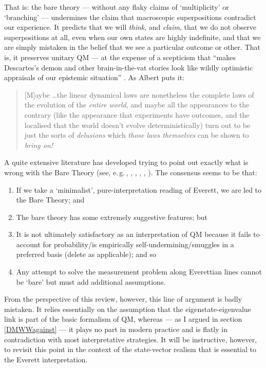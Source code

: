 \documentclass[12pt]{article}
\newcommand{\egc}{\mbox{e.\,g.\,}}
\begin{document}
That is: the bare theory --- without any flaky claims of `multiplicity' or `branching' --- undermines the claim that macroscopic superpositions contradict our experience. It predicts that we will \emph{think}, and \emph{claim}, that we do not observe superpositions at all, even when our own states are highly indefinite, and that we are simply mistaken in the belief that we see a particular outcome or other. That is, it preserves unitary QM --- at the expense of a scepticism that ``makes Descartes's demon and other brain-in-the-vat stories look like wildly optimistic appraisals of our epistemic situation'' \cite[p.\,94]{barrettbook}. As Albert puts it:
\begin{quote}
[M]aybe \ldots the linear dynamical laws are nonetheless the complete laws of the evolution of the \emph{entire world}, and maybe all the appearances to the contrary (like the appearance that experiments have outcomes, and the localised that the world doesn't evolve deterministically) turn out to be just the sorts of \emph{delusions} which \emph{those laws themselves} can be shown to \emph{bring on!} 
\end{quote}
A quite extensive literature has developed trying to point out exactly what is wrong with the Bare Theory (see, \egc, , , , , ). The consensus seems to be that:
\begin{enumerate}
\item If we take a `minimalist', pure-interpretation reading of Everett, we are led to the Bare Theory; and
\item The bare theory has some extremely suggestive features; but
\item It is not ultimately satisfactory as an interpretation of QM because it fails to account for probability/is empirically self-undermining/smuggles in a preferred basis (delete as applicable); and so
\item Any attempt to solve the measurement problem along Everettian lines cannot be `bare' but must add additional assumptions.
\end{enumerate}

From the perspective of this review, however, this line of argument is badly mistaken. It relies essentially on the assumption that the eigenstate-eigenvalue link is part of the basic formalism of QM, whereas --- as I argued in section \ref{DMWWagainst} --- it plays no part in modern practice and is flatly in contradiction with most interpretative strategies. It will be instructive, however, to revisit this point in the context of the state-vector realism that is essential to the Everett interpretation.
\end{document}
